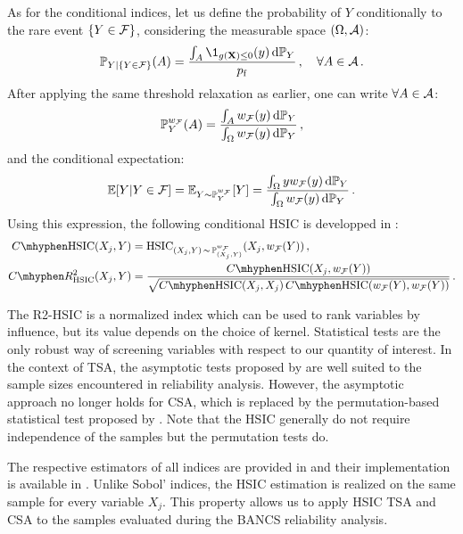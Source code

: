 As for the conditional indices, let us define the probability of $Y$ conditionally to the rare event $\{Y \in \mathcal{F}\}$, considering the measurable space $(\Omega, \mathcal{A})$:
\begin{equation}
    \P_{Y|\{Y\in\iF\}}(A) = \frac{\int_{A} \1_{g(\bX)\leq0}(y) \, \dd \P_Y}{\pf}\,, \quad \forall A \in \iA\,.
\end{equation}
After applying the same threshold relaxation as earlier, one can write $\forall A \in \mathcal{A}$: 
\begin{equation}
    \mathbb{P}_Y^{w_{\mathcal{F}}}(A)= \frac{\int_A w_{\mathcal{F}}(y) \, \mathrm{d} \mathbb{P}_Y}{\int_{\Omega} w_{\mathcal{F}}(y) \, \mathrm{d} \mathbb{P}_Y} \, ,
\end{equation}
and the conditional expectation: 
\begin{equation}
    \mathbb{E}[Y|Y \in \mathcal{F}] = \mathbb{E}_{Y\sim\mathbb{P}_Y^{w_{\mathcal{F}}}}[Y] = \frac{\int_\Omega y w_{\mathcal{F}}(y) \, \mathrm{d} \mathbb{P}_Y}{\int_{\Omega} w_{\mathcal{F}}(y) \, \mathrm{d} \mathbb{P}_Y}\, .
\end{equation}
Using this expression, the following conditional HSIC is developped in \citet{marrel_chabridon_2021}:
\begin{subequations}
    \begin{align}
        C \mhyphen \HSIC(X_j, Y) & = \HSIC_{(X_j, Y) \,\sim\, \P_{(X_j, Y)}^{w_{\iF}}} (X_j, w_{\iF}(Y)) \, ,\\
        C \mhyphen R^2_{\HSIC}(X_j, Y) &= \frac{C \mhyphen \HSIC(X_j, w_{\iF}(Y))}{\sqrt{C \mhyphen \HSIC(X_j, X_j) \, C \mhyphen \HSIC(w_{\iF}(Y), w_{\iF}(Y))}}\, .
    \end{align}
\end{subequations}

The R2-HSIC is a normalized index which can be used to rank variables by influence, but its value depends on the choice of kernel. 
Statistical tests are the only robust way of screening variables with respect to our quantity of interest. 
In the context of TSA, the asymptotic tests proposed by \citet{gretton_2006} are well suited to the sample sizes encountered in reliability analysis. 
However, the asymptotic approach no longer holds for CSA, which is replaced by the permutation-based statistical test proposed by \citet{delozzo_2016_hsic_test}.
Note that the HSIC generally do not require independence of the samples but the permutation tests do. 

The respective estimators of all indices are provided in \citet{marrel_chabridon_2021} and their implementation is available in \ot.
Unlike Sobol' indices, the HSIC estimation is realized on the same sample for every variable $X_j$. 
This property allows us to apply HSIC TSA and CSA to the samples evaluated during the BANCS reliability analysis.


